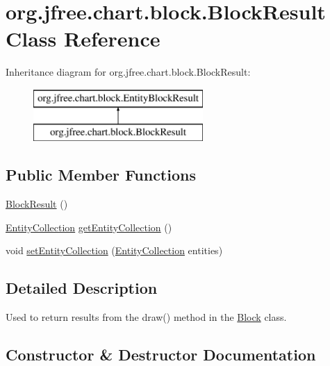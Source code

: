 \hypertarget{classorg_1_1jfree_1_1chart_1_1block_1_1_block_result}{}\section{org.\+jfree.\+chart.\+block.\+Block\+Result Class Reference}
\label{classorg_1_1jfree_1_1chart_1_1block_1_1_block_result}
Inheritance diagram for org.\+jfree.\+chart.\+block.\+Block\+Result\+:\begin{figure}[H]
\begin{center}
\leavevmode
\includegraphics[height=2.000000cm]{classorg_1_1jfree_1_1chart_1_1block_1_1_block_result}
\end{center}
\end{figure}
\subsection*{Public Member Functions}
\begin{DoxyCompactItemize}
\item 
\mbox{\hyperlink{classorg_1_1jfree_1_1chart_1_1block_1_1_block_result_a9e229004a32762f5a493160c1d7af35c}{Block\+Result}} ()
\item 
\mbox{\hyperlink{interfaceorg_1_1jfree_1_1chart_1_1entity_1_1_entity_collection}{Entity\+Collection}} \mbox{\hyperlink{classorg_1_1jfree_1_1chart_1_1block_1_1_block_result_a5c6323fdf9c8638e8e00876f495da5f8}{get\+Entity\+Collection}} ()
\item 
void \mbox{\hyperlink{classorg_1_1jfree_1_1chart_1_1block_1_1_block_result_aa962472969e278c463732a20d0e012dc}{set\+Entity\+Collection}} (\mbox{\hyperlink{interfaceorg_1_1jfree_1_1chart_1_1entity_1_1_entity_collection}{Entity\+Collection}} entities)
\end{DoxyCompactItemize}


\subsection{Detailed Description}
Used to return results from the draw() method in the \mbox{\hyperlink{interfaceorg_1_1jfree_1_1chart_1_1block_1_1_block}{Block}} class. 

\subsection{Constructor \& Destructor Documentation}
\mbox{\label{classorg_1_1jfree_1_1chart_1_1block_1_1_block_result_a9e229004a32762f5a493160c1d7af35c}} 
